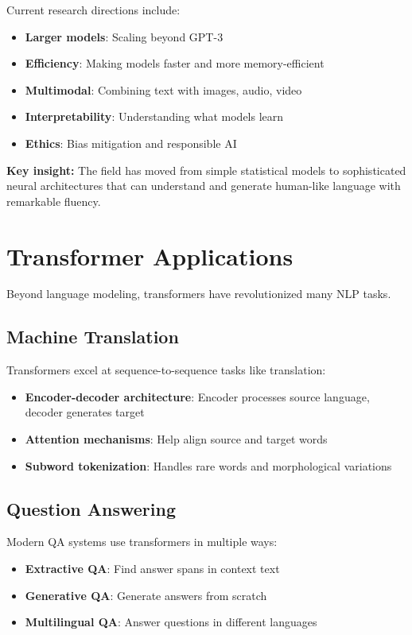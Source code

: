 \documentclass[11pt,a4paper]{article}
\theoremstyle{definition}
\theoremstyle{plain}
\theoremstyle{remark}
\begin{document}
Current research directions include:

\begin{itemize}
    \item \textbf{Larger models}: Scaling beyond GPT-3
    \item \textbf{Efficiency}: Making models faster and more memory-efficient
    \item \textbf{Multimodal}: Combining text with images, audio, video
    \item \textbf{Interpretability}: Understanding what models learn
    \item \textbf{Ethics}: Bias mitigation and responsible AI
\end{itemize}

\textbf{Key insight:} The field has moved from simple statistical models to sophisticated neural architectures that can understand and generate human-like language with remarkable fluency.

\section{Transformer Applications}

Beyond language modeling, transformers have revolutionized many NLP tasks.

\subsection{Machine Translation}

Transformers excel at sequence-to-sequence tasks like translation:

\begin{itemize}
    \item \textbf{Encoder-decoder architecture}: Encoder processes source language, decoder generates target
    \item \textbf{Attention mechanisms}: Help align source and target words
    \item \textbf{Subword tokenization}: Handles rare words and morphological variations
\end{itemize}

\subsection{Question Answering}

Modern QA systems use transformers in multiple ways:

\begin{itemize}
    \item \textbf{Extractive QA}: Find answer spans in context text
    \item \textbf{Generative QA}: Generate answers from scratch
    \item \textbf{Multilingual QA}: Answer questions in different languages
\end{itemize}
\end{document}
